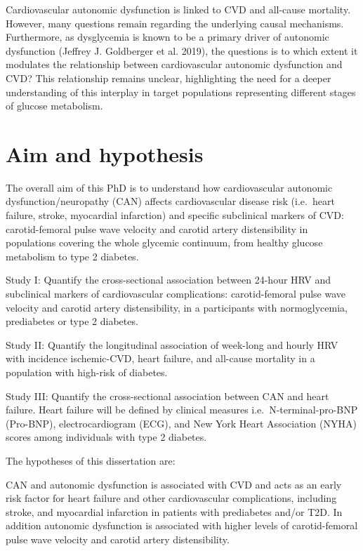 \documentclass[
  a4paper,
  headsepline=true,
  open=any]{scrbook}
\begin{document}
Cardiovascular autonomic dysfunction is linked to CVD and all-cause
mortality. However, many questions remain regarding the underlying
causal mechanisms. Furthermore, as dysglycemia is known to be a primary
driver of autonomic dysfunction (Jeffrey J. Goldberger et al. 2019), the
questions is to which extent it modulates the relationship between
cardiovascular autonomic dysfunction and CVD? This relationship remains
unclear, highlighting the need for a deeper understanding of this
interplay in target populations representing different stages of glucose
metabolism.


\hypertarget{aim-and-hypothesis}{%
\chapter{Aim and hypothesis}\label{aim-and-hypothesis}}

The overall aim of this PhD is to understand how cardiovascular
autonomic dysfunction/neuropathy (CAN) affects cardiovascular disease
risk (i.e.~heart failure, stroke, myocardial infarction) and specific
subclinical markers of CVD: carotid-femoral pulse wave velocity and
carotid artery distensibility in populations covering the whole glycemic
continuum, from healthy glucose metabolism to type 2 diabetes.

Study I: Quantify the cross-sectional association between 24-hour HRV
and subclinical markers of cardiovascular complications: carotid-femoral
pulse wave velocity and carotid artery distensibility, in a participants
with normoglycemia, prediabetes or type 2 diabetes.

Study II: Quantify the longitudinal association of week-long and hourly
HRV with incidence ischemic-CVD, heart failure, and all-cause mortality
in a population with high-risk of diabetes.

Study III: Quantify the cross-sectional association between CAN and
heart failure. Heart failure will be defined by clinical measures
i.e.~N-terminal-pro-BNP (Pro-BNP), electrocardiogram (ECG), and New York
Heart Association (NYHA) scores among individuals with type 2 diabetes.

The hypotheses of this dissertation are:

CAN and autonomic dysfunction is associated with CVD and acts as an
early risk factor for heart failure and other cardiovascular
complications, including stroke, and myocardial infarction in patients
with prediabetes and/or T2D. In addition autonomic dysfunction is
associated with higher levels of carotid-femoral pulse wave velocity and
carotid artery distensibility.
\end{document}
